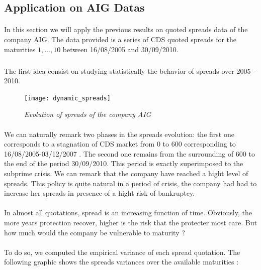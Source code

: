 \subsection{Application on AIG Datas}
\label{sec:appl-aig-datas}
\paragraph{}
In this section we will apply the previous results on quoted spreads data of the
company  AIG. The  data provided  is  a series  of  CDS quoted  spreads for  the
maturities $1,\dots,10$ between 16/08/2005 and 30/09/2010.

\subparagraph{}
The first  idea consist on studying  statistically the behavior of  spreads over
2005 - 2010. 

\begin{figure}[H]
  \centering 
  \texttt{[image: dynamic\_spreads]}
  \caption{\it Evolution of spreads of the company AIG }
  \label{fig:5}
\end{figure}
\paragraph{}
We  can naturally  remark two  phases in  the spreads  evolution: the  first one
corresponds  to a  stagnation of  CDS  market from  0 to  600 corresponding  to
16/08/2005-03/12/2007 .  The second one remains from the surrounding of 600 to
the end  of the period  30/09/2010. This period  is exactly superimposed  to the
subprime crisis. We  can remark that the  company have reached a  hight level of
spreads. This policy  is quite  natural in  a period of  crisis, the  company had  had to
increase her spreads in presence of a hight risk of bankruptcy. \\

\paragraph{}
In almost all  quotations, spread is an increasing function  of time. Obviously,
the more  years protection recover, higher  is the risk that  the protecter most
care. But how much would the company be vulnerable to maturity ?
\paragraph{}
To do so, we computed the empirical variance of each spread quotation. 
 The following
graphic shows the spreads variances over the available maturities :


